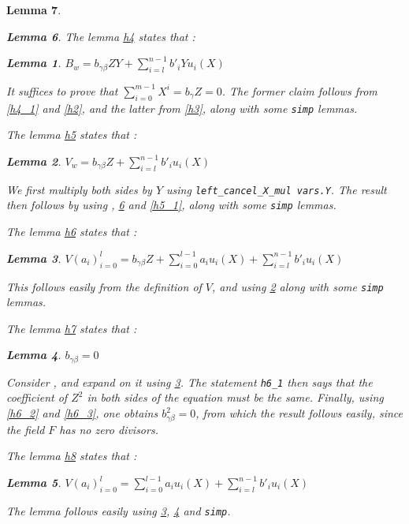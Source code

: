 \documentclass{article}
\newtheorem{lemma}{Lemma}
\theoremstyle{definition}
\theoremstyle{remark}
\begin{document}
\begin{lemma}
\begin{lemma}
The lemma \href{https://github.com/BoltonBailey/formal-snarks-project/blob/7fd9cd122f5887f88f6a706b4f2a68a7153c7381/src/snarks/babysnark/knowledge_soundness.lean#L381}{h4} states that :
\theoremstyle{lemma} \label{h4}
\begin{lemma}
  $B_w = b_{\gamma \beta} ZY + \sum_{i = l}^{n - 1} b'_i Y u_i(X) $
\end{lemma}
It suffices to prove that $\sum_{i = 0}^{m - 1} X^i = b_{\gamma}Z = 0$. The former claim follows from \ref{h4_1} and \ref{h2}, and the latter from \ref{h3}, along with some \texttt{simp} lemmas.

The lemma \href{https://github.com/BoltonBailey/formal-snarks-project/blob/7fd9cd122f5887f88f6a706b4f2a68a7153c7381/src/snarks/babysnark/knowledge_soundness.lean#L387}{h5} states that :
\theoremstyle{lemma}
\begin{lemma} \label{h5}
  $V_w = b_{\gamma \beta} Z + \sum_{i = l}^{n - 1} b'_i u_i(X) $
\end{lemma}
We first multiply both sides by $Y$ using \texttt{left\_cancel\_X\_mul vars.Y}. The result then follows by using , \ref{h4} and \ref{h5_1}, along with some \texttt{simp} lemmas.

The lemma \href{https://github.com/BoltonBailey/formal-snarks-project/blob/7fd9cd122f5887f88f6a706b4f2a68a7153c7381/src/snarks/babysnark/knowledge_soundness.lean#L399}{h6} states that :
\theoremstyle{lemma}
\begin{lemma} \label{h6}
  $V (a_i)_{i = 0}^{l} = b_{\gamma \beta} Z + \sum_{i = 0}^{l - 1} a_i u_i(X) + \sum_{i = l}^{n - 1} b'_i u_i(X) $
\end{lemma}
This follows easily from the definition of $V$, and using \ref{h5} along with some \texttt{simp} lemmas.

The lemma \href{https://github.com/BoltonBailey/formal-snarks-project/blob/7fd9cd122f5887f88f6a706b4f2a68a7153c7381/src/snarks/babysnark/knowledge_soundness.lean#L411}{h7} states that :
\theoremstyle{lemma}
\begin{lemma} \label{h7}
  $b_{\gamma \beta} = 0$
\end{lemma}
Consider , and expand on it using \ref{h6}. The statement \texttt{h6\_1} then says that the coefficient of $Z^2$ in both sides of the equation must be the same. Finally, 
using \ref{h6_2} and \ref{h6_3}, one obtains $b_{\gamma \beta}^2 = 0$, from which the result follows easily, since the field $F$ has no zero divisors. 

The lemma \href{https://github.com/BoltonBailey/formal-snarks-project/blob/7fd9cd122f5887f88f6a706b4f2a68a7153c7381/src/snarks/babysnark/knowledge_soundness.lean#L419}{h8} states that :
\theoremstyle{lemma}
\begin{lemma} \label{h8}
  $V (a_i)_{i = 0}^{l} = \sum_{i = 0}^{l - 1} a_i u_i(X) + \sum_{i = l}^{n - 1} b'_i u_i(X) $
\end{lemma}
The lemma follows easily using \ref{h6}, \ref{h7} and \texttt{simp}.


\end{lemma}
\end{lemma}
\end{document}
